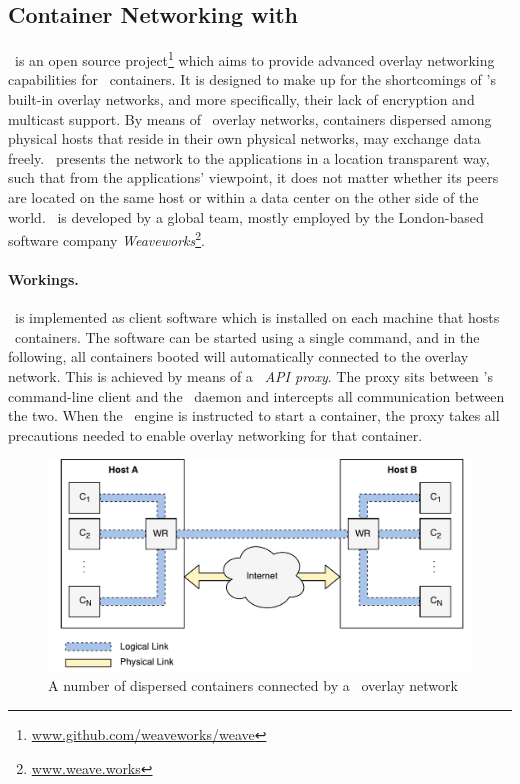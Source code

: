
\subsection{Container Networking with \wnet}

\wnet\ is an open source project\footnote{\url{www.github.com/weaveworks/weave}} which aims to provide advanced overlay networking capabilities for \docker\ containers. It is designed to make up for the shortcomings of \docker 's built-in overlay networks, and more specifically, their lack of encryption and multicast support. By means of \docker\ overlay networks, containers dispersed among physical hosts that reside in their own physical networks, may exchange data freely. \wnet\ presents the network to the applications in a location transparent way, such that from the applications' viewpoint, it does not matter whether its peers are located on the same host or within a data center on the other side of the world. \wnet\ is developed by a global team, mostly employed by the London-based software company \emph{Weaveworks}\footnote{\url{www.weave.works}}.


\paragraph{Workings.}
\wnet\ is implemented as client software which is installed on each machine that hosts \docker\ containers. The software can be started using a single command, and in the following, all containers booted will automatically connected to the overlay network. This is achieved by means of a \emph{\docker\ API proxy}. The proxy sits between \docker 's command-line client and the \docker\ daemon and intercepts all communication between the two. When the \docker\ engine is instructed to start a container, the proxy takes all precautions needed to enable overlay networking for that container.


\begin{figure}[htpb]
  \centering
  \includegraphics[width=\textwidth]{figures/sdn.pdf}
  \caption[An example of containers connected via \wnet\ overlay network]{A number of dispersed containers connected by a \wnet\ overlay network}\label{fig:weavescheme} 
\end{figure}

